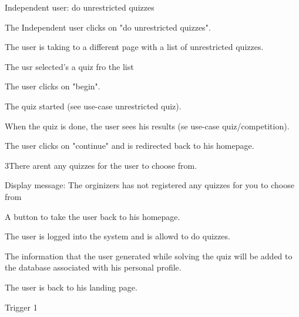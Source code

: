 \begin{uc}{Independent user: do unrestricted quizzes}

    \begin{uc-mss}
    \item The Independent user clicks on "do unrestricted quizzes".
    \item The user is taking to a different page with a list of unrestricted quizzes.
    \item The usr selected's a quiz fro the list
    \item The user clicks on "begin".
    \item The quiz started (see use-case unrestricted quiz).
    \item When the quiz is done, the user sees his results (se use-case quiz/competition).
    \item The user clicks on "continue" and is redirected back to his homepage.
    \end{uc-mss}

    \begin{uc-ext}
        \begin{uc-fail}{3}{There arent any quizzes for the user to choose from.}
        \item Display message: The orginizers has not registered any quizzes for you to choose from
        \item A button to take the user back to his homepage.
        \end{uc-fail}

    \end{uc-ext}

    \begin{uc-pre}
    \item The user is logged into the system and is allowd to do quizzes.
    \end{uc-pre}

    \begin{uc-post}
    \item The information that the user generated while solving the quiz will be added to the database associated with his personal profile.
    \item The user is back to his landing page. 
    \end{uc-post}

    \begin{uc-trig}
        Trigger 1
    \end{uc-trig}

\end{uc}

